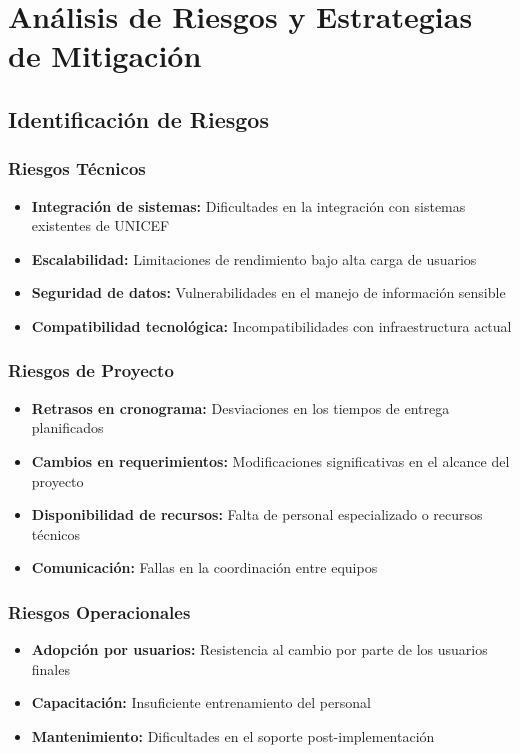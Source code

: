 \section{Análisis de Riesgos y Estrategias de Mitigación}

\subsection{Identificación de Riesgos}

\subsubsection{Riesgos Técnicos}
\begin{itemize}
    \item \textbf{Integración de sistemas:} Dificultades en la integración con sistemas existentes de UNICEF
    \item \textbf{Escalabilidad:} Limitaciones de rendimiento bajo alta carga de usuarios
    \item \textbf{Seguridad de datos:} Vulnerabilidades en el manejo de información sensible
    \item \textbf{Compatibilidad tecnológica:} Incompatibilidades con infraestructura actual
\end{itemize}

\subsubsection{Riesgos de Proyecto}
\begin{itemize}
    \item \textbf{Retrasos en cronograma:} Desviaciones en los tiempos de entrega planificados
    \item \textbf{Cambios en requerimientos:} Modificaciones significativas en el alcance del proyecto
    \item \textbf{Disponibilidad de recursos:} Falta de personal especializado o recursos técnicos
    \item \textbf{Comunicación:} Fallas en la coordinación entre equipos
\end{itemize}

\subsubsection{Riesgos Operacionales}
\begin{itemize}
    \item \textbf{Adopción por usuarios:} Resistencia al cambio por parte de los usuarios finales
    \item \textbf{Capacitación:} Insuficiente entrenamiento del personal
    \item \textbf{Mantenimiento:} Dificultades en el soporte post-implementación
\end{itemize}

